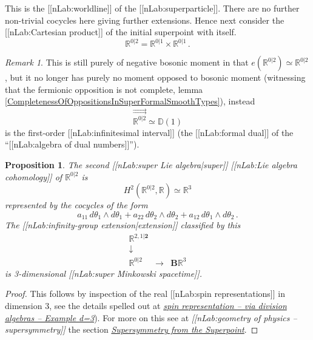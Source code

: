 \documentclass[12pt,titlepage]{article}
\newcommand{\itexarray}[1]{\begin{matrix}#1\end{matrix}}
\theoremstyle{plain}
\newtheorem{prop}{Proposition}
\theoremstyle{definition}
\theoremstyle{remark}
\newtheorem{remark}{Remark}
\begin{document}
This is the [[nLab:worldline]] of the [[nLab:superparticle]].
There are no further non-trivial cocycles here giving further extensions.
Hence next consider the [[nLab:Cartesian product]] of the initial superpoint with itself.
\begin{displaymath}
\mathbb{R}^{0|2}
  =
  \mathbb{R}^{0|1}\times \mathbb{R}^{0|1}
  \,.
\end{displaymath}
\begin{remark}
\label{}\hypertarget{}{}
This is still purely of negative bosonic moment in that $e(\mathbb{R}^{0|2}) \simeq \mathbb{R}^{0|2}$, but it no longer has purely no moment opposed to bosonic moment (witnessing that the fermionic opposition is not complete, lemma \ref{CompletenessOfOppositionsInSuperFormalSmoothTypes}), instead
\begin{displaymath}
\stackrel{\rightrightarrows}{\mathbb{R}^{0|2}}
  \simeq
  \mathbb{D}(1)
\end{displaymath}
is the first-order [[nLab:infinitesimal interval]] (the [[nLab:formal dual]] of the ``[[nLab:algebra of dual numbers]]'').
\end{remark}
\begin{prop}
\label{3dSuperMinkowskiSpacetime}\hypertarget{3dSuperMinkowskiSpacetime}{}
The second [[nLab:super Lie algebra|super]] [[nLab:Lie algebra cohomology]] of $\mathbb{R}^{0\vert 2}$ is
\begin{displaymath}
H^2(\mathbb{R}^{0\vert 2}, \mathbb{R})
  \simeq
  \mathbb{R}^3
\end{displaymath}
represented by the cocycles of the form
\begin{displaymath}
a_{11}
  \,
  d\theta_1 \wedge d\theta_1
   +
  a_{22}
  \,
  d\theta_2 \wedge d\theta_2
  +
  a_{12}
  \,
  d\theta_1 \wedge d\theta_2
  \,.
\end{displaymath}
The [[nLab:infinity-group extension|extension]] classified by this
\begin{displaymath}
\itexarray{
     \mathbb{R}^{2,1|\mathbf{2}}
     \\
     \downarrow
     \\
     \mathbb{R}^{0|2}
     &\stackrel{}{\longrightarrow}&
     \mathbf{B} \mathbb{R}^3
  }
\end{displaymath}
is 3-dimensional [[nLab:super Minkowski spacetime]].
\end{prop}
\begin{proof}
This follows by inspection of the real [[nLab:spin representations]] in dimension 3, see the details spelled out at \emph{\href{http://ncatlab.org/nlab/show/spin%20representation#RealSpinorRepsIn3d}{spin representation -- via division algebras -- Example d=3}}).
For more on this see at \emph{[[nLab:geometry of physics -- supersymmetry]]} the section \emph{\href{https://ncatlab.org/nlab/show/geometry+of+physics+--+supersymmetry#SupersymmetryFromTheSuperpoint}{Supersymmetry from the Superpoint}}.
\end{proof}
\end{document}
